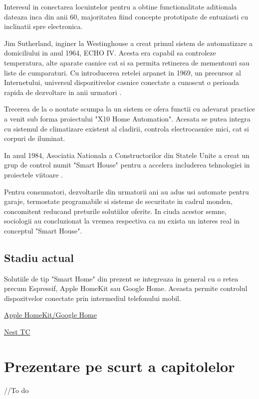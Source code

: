 Interesul in conectarea locuintelor pentru a obtine functionalitate aditionala dateaza inca din anii 60, majoritatea fiind concepte prototipate de entuziasti cu inclinatii spre electronica.

Jim Sutherland, inginer la Westinghouse a creat primul sistem de automatizare a domiciliului in anul 1964, ECHO IV. Acesta era capabil sa controleze temperatura, alte aparate casnice cat si sa permita retinerea de mementouri sau liste de cumparaturi. Cu introducerea retelei \acrfull{arpanet} in 1969, un precursor al Internetului, universul dispozitivelor casnice conectate a cunoscut o perioada rapida de dezvoltare in anii urmatori \cite{ZeusIntegratedSystems}.

Trecerea de la o noutate scumpa la un sistem ce ofera functii cu adevarat practice a venit sub forma proiectului "X10 Home Automation". Acesata se putea integra cu sistemul de climatizare existent al cladirii, controla electrocasnice mici, cat si corpuri de iluminat.

In anul 1984, Asociatia Nationala a Constructorilor din Statele Unite a creat un grup de control numit "Smart House" pentru a accelera includerea tehnologiei in proiectele viitoare \cite{Aldrich2003Smart}.

Pentru consumatori, dezvoltarile din urmatorii ani au adus usi automate pentru garaje, termostate programabile si sisteme de securitate in cadrul monden, concomitent reducand preturile solutiilor oferite. In ciuda acestor semne, sociologii au concluzionat la vremea respectiva ca nu exista un interes real in conceptul "Smart House".


\subsection {Stadiu actual}

Solutiile de tip "Smart Home" din prezent se integreaza in general cu o retea precum Espressif, Apple HomeKit sau Google Home. Aceasta permite controlul dispozitvelor conectate prin intermediul telefonului mobil.

\href{https://www.familyhandyman.com/article/the-history-of-smart-home-technology/}{Apple HomeKit/Google Home}

\href{https://techcrunch.com/2013/05/11/from-the-garage-to-200-employees-in-3-years-how-nest-thermostats-were-born/}{Nest TC}


\section {Prezentare pe scurt a capitolelor}

//To do